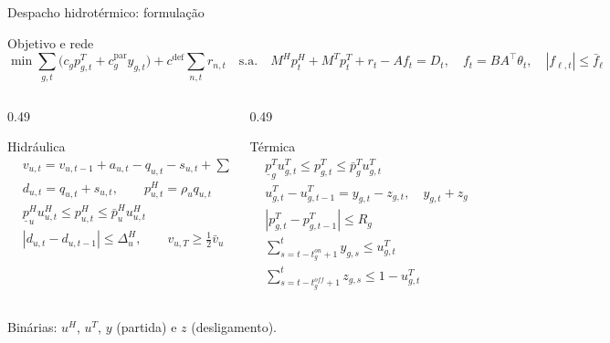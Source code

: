 \documentclass[10pt,aspectratio=169]{beamer}
\newcommand{\pH}{p^{H}}
\newcommand{\pT}{p^{T}}
\newcommand{\uH}{u^{H}}
\newcommand{\uT}{u^{T}}
\newcommand{\displaycompacto}{%
  \setlength{\abovedisplayskip}{2pt}%
  \setlength{\belowdisplayskip}{2pt}%
  \setlength{\abovedisplayshortskip}{2pt}%
  \setlength{\belowdisplayshortskip}{2pt}%
}
\begin{document}
\begin{frame}{Despacho hidrotérmico: formulação}
  \footnotesize
  \displaycompacto
  \begin{block}{Objetivo e rede}
    \[
      \min \sum_{g,t} \bigl( c_g \pT_{g,t} + c^{\text{par}}_g y_{g,t} \bigr)
           + c^{\text{def}} \sum_{n,t} r_{n,t}
      \quad\text{s.a.}\quad
      M^H \pH_t + M^T \pT_t + r_t - A f_t = D_t, \quad
      f_t = B A^\top \theta_t, \quad |f_{\ell,t}| \le \bar f_\ell
    \]
  \end{block}

  \begin{columns}[T]
    \begin{column}{0.49\textwidth}
      \begin{block}{Hidráulica}
        \begin{align*}
          & v_{u,t} = v_{u,t-1} + a_{u,t} - q_{u,t} - s_{u,t} + \textstyle\sum_{m} d_{m,t} \\
          & d_{u,t} = q_{u,t} + s_{u,t}, \qquad \pH_{u,t} = \rho_u q_{u,t} \\
          & \underline{p}^H_u \uH_{u,t} \le \pH_{u,t} \le \bar p^H_u \uH_{u,t} \\
          & |d_{u,t} - d_{u,t-1}| \le \Delta^H_u, \qquad v_{u,T} \ge \tfrac12 \bar v_u
        \end{align*}
      \end{block}
    \end{column}
    \begin{column}{0.49\textwidth}
      \begin{block}{Térmica}
        \begin{align*}
          & \underline{p}^T_g \uT_{g,t} \le \pT_{g,t} \le \bar p^T_g \uT_{g,t} \\
          & \uT_{g,t} - \uT_{g,t-1} = y_{g,t} - z_{g,t}, \quad y_{g,t} + z_{g,t} \le 1 \\
          & |\pT_{g,t} - \pT_{g,t-1}| \le R_g \\
          & \textstyle\sum_{s=t-t^{on}_g+1}^{t} y_{g,s} \le \uT_{g,t} \\
          & \textstyle\sum_{s=t-t^{off}_g+1}^{t} z_{g,s} \le 1 - \uT_{g,t}
        \end{align*}
      \end{block}
    \end{column}
  \end{columns}

  \vspace{0.2em}
  \scriptsize
  Binárias: $\uH$, $\uT$, $y$ (partida) e $z$ (desligamento).
\end{frame}
\end{document}
